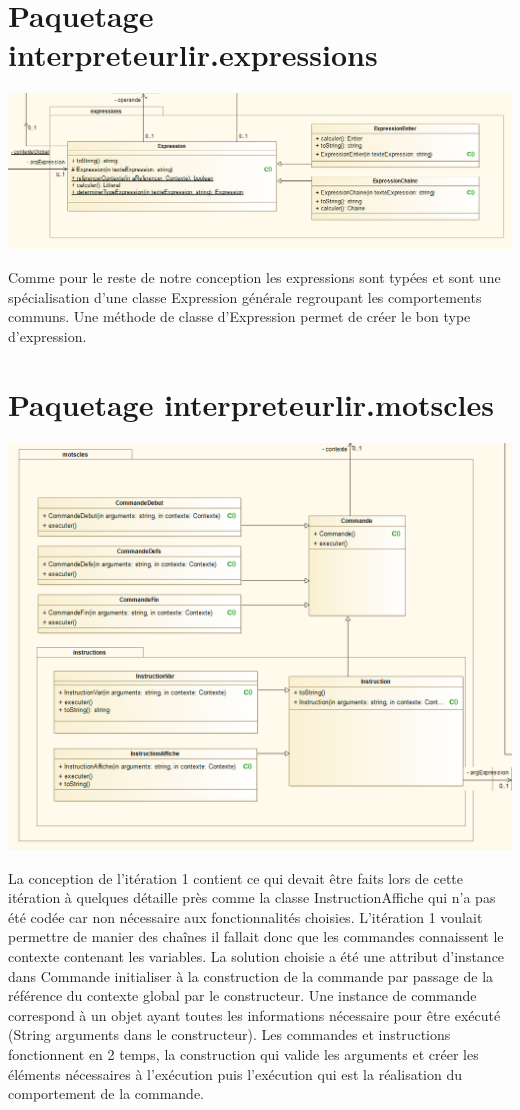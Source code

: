 \section{Paquetage interpreteurlir.expressions}
\includegraphics[scale=0.60]{./img/COO/COO_prototype_1/PackageExpressions}
\par Comme pour le reste de notre conception les expressions sont typées et sont une spécialisation d'une classe Expression générale regroupant les comportements communs. Une méthode de classe d'Expression permet de créer le bon type d'expression.

\section{Paquetage interpreteurlir.motscles}
\includegraphics[scale=0.60]{./img/COO/COO_prototype_1/PackageMotscles}
\par La conception de l'itération 1 contient ce qui devait être faits lors de cette itération à quelques détaille près comme la classe InstructionAffiche qui n'a pas été codée car non nécessaire aux fonctionnalités choisies.
L'itération 1 voulait permettre de manier des chaînes il fallait donc que les commandes connaissent le contexte contenant les variables. La solution choisie a été une attribut d'instance dans Commande initialiser à la construction de la commande par passage de la référence du contexte global par le constructeur. Une instance de commande correspond à un objet ayant toutes les informations nécessaire pour être exécuté (String arguments dans le constructeur). Les commandes et instructions fonctionnent en 2 temps, la construction qui valide les arguments et créer les éléments nécessaires à l'exécution puis l'exécution qui est la réalisation du comportement de la commande.


